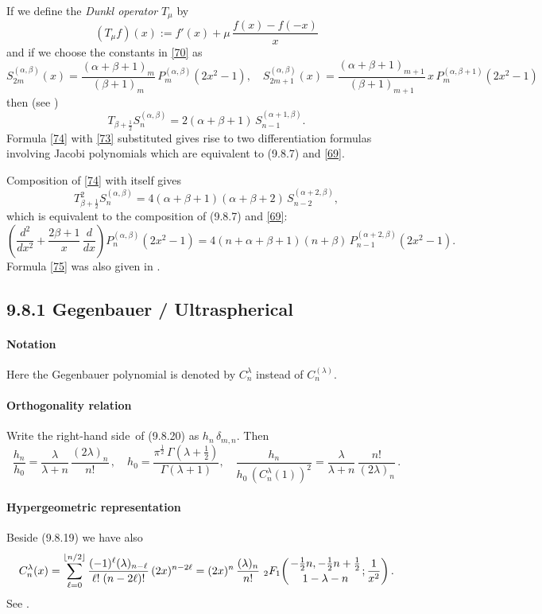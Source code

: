 \documentclass[twoside,11pt]{article}
\newcommand\al\alpha
\newcommand\be\beta
\newcommand\de\delta
\newcommand\la\lambda
\newcommand\Ga{\Gamma}
\newcommand\half{\frac12}
\newcommand\thalf{\tfrac12}
\newcommand{\hyp}[5]{\,\mbox{}_{#1}F_{#2}\!\left(
  \genfrac{}{}{0pt}{}{#3}{#4};#5\right)}
\newcommand\RHS{right-hand side}
\begin{document}
If we define the {\em Dunkl operator} $T_\mu$ by
\begin{equation}
(T_\mu f)(x):=f'(x)+\mu\,\frac{f(x)-f(-x)}x
\label{72}
\end{equation}
and if we choose the constants in \eqref{70} as
\begin{equation}
S_{2m}^{(\al,\be)}(x)=\frac{(\al+\be+1)_m}{(\be+1)_m}\, P_m^{(\al,\be)}(2x^2-1),\quad
S_{2m+1}^{(\al,\be)}(x)=\frac{(\al+\be+1)_{m+1}}{(\be+1)_{m+1}}\,
x\,P_m^{(\al,\be+1)}(2x^2-1)
\label{73}
\end{equation}
then (see \cite[(1.6)]{K5})
\begin{equation}
T_{\be+\half}S_n^{(\al,\be)}=2(\al+\be+1)\,S_{n-1}^{(\al+1,\be)}.
\label{74}
\end{equation}
Formula \eqref{74} with \eqref{73} substituted gives rise to two
differentiation formulas involving Jacobi polynomials which are equivalent to
(9.8.7) and \eqref{69}.

Composition of \eqref{74} with itself gives
\[
T_{\be+\half}^2S_n^{(\al,\be)}=4(\al+\be+1)(\al+\be+2)\,S_{n-2}^{(\al+2,\be)},
\]
which is equivalent to the composition of (9.8.7) and \eqref{69}:
\begin{equation}
\left(\frac{d^2}{dx^2}+\frac{2\be+1}x\,\frac d{dx}\right)P_n^{(\al,\be)}(2x^2-1)
=4(n+\al+\be+1)(n+\be)\,P_{n-1}^{(\al+2,\be)}(2x^2-1).
\label{75}
\end{equation}
Formula \eqref{75} was also given in .
%
\subsection*{9.8.1 Gegenbauer / Ultraspherical}
\label{sec9.8.1}
%
\paragraph{Notation}
Here the Gegenbauer polynomial is denoted by $C_n^\la$ instead of $C_n^{(\la)}$.
%
\paragraph{Orthogonality relation}
Write the \RHS\ of (9.8.20) as $h_n\,\de_{m,n}$. Then
\begin{equation}
\frac{h_n}{h_0}=
\frac\la{\la+n}\,\frac{(2\la)_n}{n!}\,,\quad
h_0=\frac{\pi^\half\,\Ga(\la+\thalf)}{\Ga(\la+1)},\quad
\frac{h_n}{h_0\,(C_n^\la(1))^2}=
\frac\la{\la+n}\,\frac{n!}{(2\la)_n}\,.
\label{61}
\end{equation}
%
\paragraph{Hypergeometric representation}
Beside (9.8.19) we have also
\begin{equation}
C_n^\lambda(x)=\sum_{\ell=0}^{\lfloor n/2\rfloor}\frac{(-1)^{\ell}(\lambda)_{n-\ell}}
{\ell!\;(n-2\ell)!}\,(2x)^{n-2\ell}
=(2x)^{n}\,\frac{(\lambda)_{n}}{n!}\,
\hyp21{-\thalf n,-\thalf n+\thalf}{1-\la-n}{\frac1{x^2}}.
\label{57}
\end{equation}
See .
%
\end{document}
